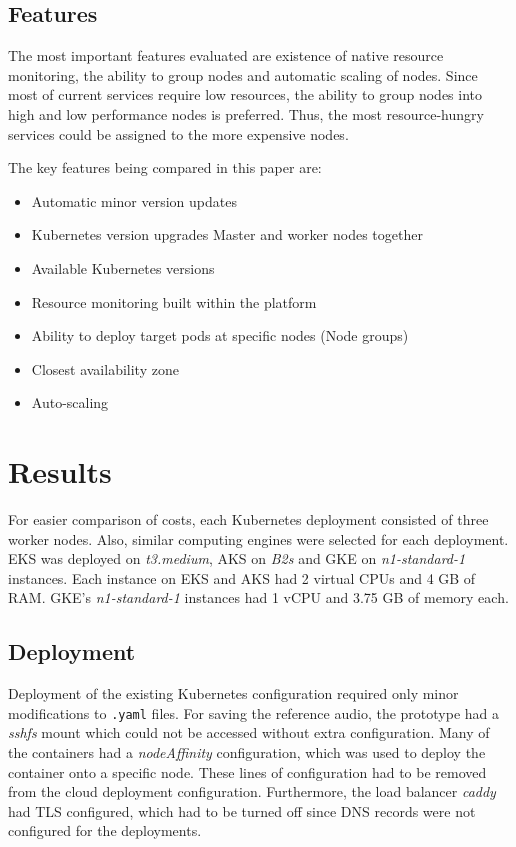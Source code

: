 \documentclass[article]{aaltoseries}
\begin{document}
\subsection{Features}

The most important features evaluated are existence of native resource monitoring, the ability to group nodes and automatic scaling of nodes. Since most of current services require low resources, the ability to group nodes into high and low performance nodes is preferred. Thus, the most resource-hungry services could be assigned to the more expensive nodes.

The key features being compared in this paper are:
\begin{itemize}
\item Automatic minor version updates
\item Kubernetes version upgrades Master and worker nodes together
\item Available Kubernetes versions
\item Resource monitoring built within the platform
\item Ability to deploy target pods at specific nodes (Node groups)
\item Closest availability zone
\item Auto-scaling
\end{itemize}

\newpage
\section{Results}

For easier comparison of costs, each Kubernetes deployment consisted of three worker nodes. Also, similar computing engines were selected for each deployment. EKS was deployed on \textit{t3.medium}, AKS on \textit{B2s} and GKE on \textit{n1-standard-1} instances. Each instance on EKS and AKS had 2 virtual CPUs and 4 GB of RAM. GKE's \textit{n1-standard-1} instances had 1 vCPU and 3.75 GB of memory each.

\subsection{Deployment}

Deployment of the existing Kubernetes configuration required only minor modifications to \texttt{.yaml} files. For saving the reference audio, the prototype had a \textit{sshfs} mount which could not be accessed without extra configuration. Many of the containers had a \textit{nodeAffinity} configuration, which was used to deploy the container onto a specific node. These lines of configuration had to be removed from the cloud deployment configuration. Furthermore, the load balancer \textit{caddy} had TLS configured, which had to be turned off since DNS records were not configured for the deployments.
\end{document}
